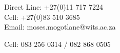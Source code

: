 






\begin{no}




Direct Line: +27(0)11 717 7224\\
Cell: +27(0)83 510 3685\\
Email: moses.mogotlane@wits.ac.za

\divider




\begin{no}
Cell: 083 256 0314 / 082 868 0505\\
\end{no}

\end{no}

